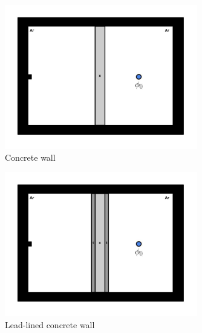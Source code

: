 \documentclass[11pt,a4paper]{article}
\begin{document}
\newpage

\begin{figure}[h!]
    \centering
    \includegraphics[width=0.75\textwidth]{hw2-15a.jpg}
    \caption{Concrete wall}
    \label{fig-concrete-wall}
\end{figure}

\begin{figure}[h!]
    \centering
    \includegraphics[width=0.75\textwidth]{hw2-15b.jpg}
    \caption{Lead-lined concrete wall}
    \label{fig-concrete-lead-wall}
\end{figure}

\newpage 


\setlength{\bibhang}{0pt}

\end{document}

